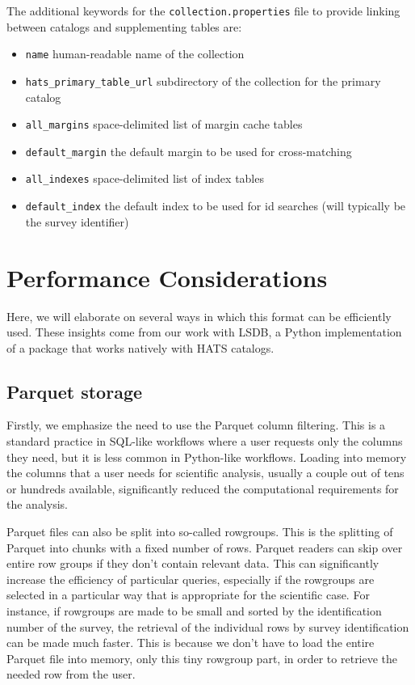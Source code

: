 \documentclass[11pt,a4paper]{ivoa}
\begin{document}
The additional keywords for the \texttt{collection.properties} file to provide linking between catalogs and supplementing tables are:

\begin{itemize}
    \item \texttt{name} human-readable name of the collection
    \item \texttt{hats\_primary\_table\_url} subdirectory of the collection for the primary catalog
    \item \texttt{all\_margins} space-delimited list of margin cache tables
    \item \texttt{default\_margin} the default margin to be used for cross-matching
    \item \texttt{all\_indexes} space-delimited list of index tables
    \item \texttt{default\_index} the default index to be used for id searches (will typically be the survey identifier)
\end{itemize}

\section{Performance Considerations}
Here, we will elaborate on several ways in which this format can be efficiently used. These insights come from our work with LSDB, a Python implementation of a package that works natively with HATS catalogs. \par
\subsection{Parquet storage}
Firstly, we emphasize the need to use the Parquet column filtering. 
This is a standard practice in SQL-like workflows where a user requests only the columns they need, but it is less common in Python-like workflows. 
Loading into memory the columns that a user needs for scientific analysis, usually a couple out of tens or hundreds available, significantly reduced the computational requirements for the analysis.  \par 
Parquet files can also be split into so-called rowgroups. This is the splitting of Parquet into chunks with a fixed number of rows. 
Parquet readers can skip over entire row groups if they don't contain relevant data. 
This can significantly increase the efficiency of particular queries, especially if the rowgroups are selected in a particular way that is appropriate for the scientific case. 
For instance, if rowgroups are made to be small and sorted by the identification number of the survey, the retrieval of the individual rows by survey identification can be made much faster. 
This is because we don't have to load the entire Parquet file into memory, only this tiny rowgroup part, in order to retrieve the needed row from the user. \par 
\end{document}
